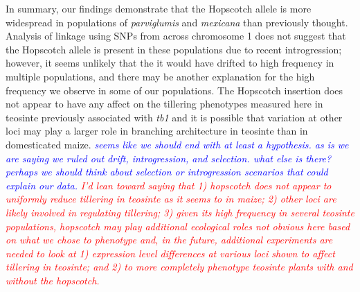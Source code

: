 \documentclass[12pt]{article}
\newcommand{\jri}[1]{\textcolor{blue}{ \emph{\scriptsize  #1}} }
\newcommand{\mbh}[1]{\textcolor{red}{ \emph{\scriptsize  #1}} }
\begin{document}
In summary, our findings demonstrate that the Hopscotch allele is more widespread in populations of \emph{parviglumis} and \emph{mexicana} than previously thought. Analysis of linkage using SNPs from across chromosome 1 does not suggest that the Hopscotch allele is present in these populations due to recent introgression; however, it seems unlikely that the it would have drifted to high frequency in multiple populations, and there may be another explanation for the high frequency we observe in some of our populations. The Hopscotch insertion does not appear to have any affect on the tillering phenotypes measured here in teosinte previously associated with \emph{tb1} and it is possible that variation at other loci may play a larger role in branching architecture in teosinte than in domesticated maize. \jri{seems like we should end with at least a hypothesis. as is we are saying we ruled out drift, introgression, and selection. what else is there? perhaps we should think about selection or introgression scenarios that could explain our data.} \mbh{I'd lean toward saying that 1) hopscotch does not appear to uniformly reduce tillering in teosinte as it seems to in maize; 2) other loci are likely involved in regulating tillering; 3) given its high frequency in several teosinte populations, hopscotch may play additional ecological roles not obvious here based on what we chose to phenotype and, in the future,  additional experiments are needed to look at 1) expression level differences at various loci shown to affect tillering in teosinte; and 2) to more completely phenotype teosinte plants with and without the hopscotch.}


\clearpage

\end{document}
